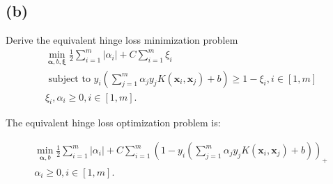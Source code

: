 \documentclass{article}
\begin{document}






\subsection*{(b)}
Derive the equivalent hinge loss minimization problem
\begin{equation}
    \begin{aligned}
        \min _{\boldsymbol{\alpha}, b, \boldsymbol{\xi}} \frac{1}{2} \sum_{i=1}^{m}\left|\alpha_{i}\right|+C \sum_{i=1}^{m} \xi_{i}                               \\
        \text { subject to } y_{i}\left(\sum_{j=1}^{m} \alpha_{j} y_{j} K\left(\boldsymbol{x}_{i}, \boldsymbol{x}_{j}\right)+b\right) \geq 1-\xi_{i}, i \in[1, m] \\
        \xi_{i}, \alpha_{i} \geq 0, i \in[1, m] .
    \end{aligned}
\end{equation}

The equivalent hinge loss optimization problem is:

\begin{equation}
    \begin{aligned}
        \min _{\boldsymbol{\alpha}, b} \frac{1}{2} \sum_{i=1}^{m}\left|\alpha_{i}\right|+C \sum_{i=1}^{m}
        \left(
        1 - y_i
        \left(
            \sum_{j=1}^{m} \alpha_{j} y_{j} K\left(\boldsymbol{x}_{i}, \boldsymbol{x}_{j}\right)+b
            \right)
        \right)_+
        \\
        \alpha_{i} \geq 0, i \in[1, m] .
    \end{aligned}
\end{equation}
\end{document}
